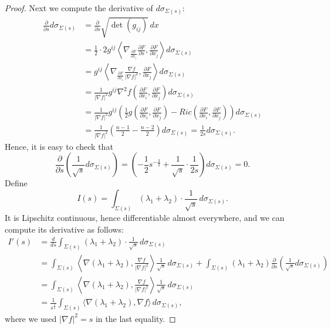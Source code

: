 \documentclass[a4, 12pt]{amsart}
\theoremstyle{plain}
\begin{document}
\begin{proof}
	Next we compute the derivative of $d\sigma_{\Sigma(s)}$:
	\begin{align*}
		\frac{\partial}{\partial s}d\sigma_{\Sigma(s)} &= \frac{\partial}{\partial s}\sqrt{\det(g_{ij})}\,dx \\
		&= \frac{1}{2} \cdot 2g^{ij}\left\langle \nabla_{\frac{\partial F}{\partial x_i}}\frac{\partial F}{\partial s}, \frac{\partial F}{\partial x_j}\right\rangle d\sigma_{\Sigma(s)} \\
		&= g^{ij}\left\langle \nabla_{\frac{\partial F}{\partial x_i}}\frac{\nabla f}{|\nabla f|^2}, \frac{\partial F}{\partial x_j}\right\rangle d\sigma_{\Sigma(s)} \\
		&= \frac{1}{|\nabla f|^2}g^{ij}\nabla^2 f\left(\frac{\partial F}{\partial x_i}, \frac{\partial F}{\partial x_j}\right)d\sigma_{\Sigma(s)} \\
		&= \frac{1}{|\nabla f|^2} g^{ij}\left(\frac{1}{2}g\left(\frac{\partial F}{\partial x_i}, \frac{\partial F}{\partial x_j}\right) - Ric\left(\frac{\partial F}{\partial x_i}, \frac{\partial F}{\partial x_j}\right)\right)d\sigma_{\Sigma(s)} \\
		&= \frac{1}{|\nabla f|^2}\left(\frac{n-1}{2} - \frac{n-2}{2}\right)d\sigma_{\Sigma(s)} = \frac{1}{2s}d\sigma_{\Sigma(s)}.
	\end{align*}
	Hence, it is easy to check that
	\[
	\frac{\partial}{\partial s}\left(\frac{1}{\sqrt{s}}d\sigma_{\Sigma(s)}\right) = \left(-\frac{1}{2}s^{-\frac{3}{2}} + \frac{1}{\sqrt{s}} \cdot \frac{1}{2s}\right) d\sigma_{\Sigma(s)} = 0.
	\]
	Define
	\[
	I(s) = \int_{\Sigma(s)} (\lambda_1+\lambda_2) \cdot \frac{1}{\sqrt{s}} \, d\sigma_{\Sigma(s)}.
	\]
	It is Lipschitz continuous, hence differentiable almost everywhere, and we can compute its derivative as follows:
	\begin{align*}
		I'(s) &= \frac{d}{ds}\int_{\Sigma(s)} (\lambda_1+\lambda_2) \cdot \frac{1}{\sqrt{s}} \, d\sigma_{\Sigma(s)} \\
		&= \int_{\Sigma(s)} \left\langle \nabla (\lambda_1+\lambda_2), \frac{\nabla f}{|\nabla f|^2}\right\rangle \frac{1}{\sqrt{s}}\,d\sigma_{\Sigma(s)} + \int_{\Sigma(s)} (\lambda_1+\lambda_2)\frac{\partial}{\partial s}\left(\frac{1}{\sqrt{s}}d\sigma_{\Sigma(s)}\right) \\
		&= \int_{\Sigma(s)} \left\langle \nabla (\lambda_1+\lambda_2), \frac{\nabla f}{|\nabla f|^2}\right\rangle \frac{1}{\sqrt{s}}\,d\sigma_{\Sigma(s)} \\
		&= \frac{1}{s^{\frac{3}{2}}}\int_{\Sigma(s)} \langle \nabla (\lambda_1+\lambda_2), \nabla f\rangle \, d\sigma_{\Sigma(s)},
	\end{align*}
	where we used $|\nabla f|^2 = s$ in the last equality.
	

\end{proof}
\end{document}
